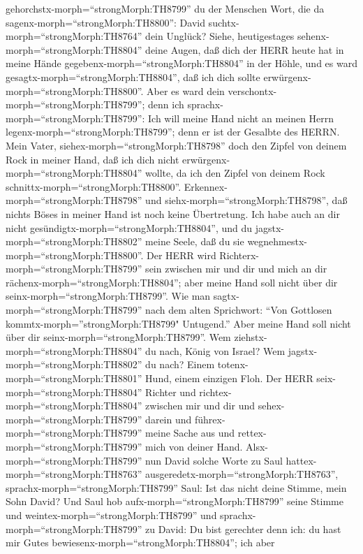 gehorchstx-morph=``strongMorph:TH8799'' du der Menschen Wort, die da
sagenx-morph=``strongMorph:TH8800'': David
suchtx-morph=``strongMorph:TH8764'' dein Unglück?  Siehe,
heutigestages sehenx-morph=``strongMorph:TH8804'' deine Augen, daß dich
der HERR heute hat in meine Hände gegebenx-morph=``strongMorph:TH8804''
in der Höhle, und es ward gesagtx-morph=``strongMorph:TH8804'', daß ich
dich sollte erwürgenx-morph=``strongMorph:TH8800''. Aber es ward dein
verschontx-morph=``strongMorph:TH8799''; denn ich
sprachx-morph=``strongMorph:TH8799'': Ich will meine Hand nicht an
meinen Herrn legenx-morph=``strongMorph:TH8799''; denn er ist der
Gesalbte des HERRN.  Mein Vater,
siehex-morph=``strongMorph:TH8798'' doch den Zipfel von deinem Rock in
meiner Hand, daß ich dich nicht erwürgenx-morph=``strongMorph:TH8804''
wollte, da ich den Zipfel von deinem Rock
schnittx-morph=``strongMorph:TH8800''.
Erkennex-morph=``strongMorph:TH8798'' und
siehx-morph=``strongMorph:TH8798'', daß nichts Böses in meiner Hand ist
noch keine Übertretung. Ich habe auch an dir nicht
gesündigtx-morph=``strongMorph:TH8804'', und du
jagstx-morph=``strongMorph:TH8802'' meine Seele, daß du sie
wegnehmestx-morph=``strongMorph:TH8800''.  Der HERR wird
Richterx-morph=``strongMorph:TH8799'' sein zwischen mir und dir und mich
an dir rächenx-morph=``strongMorph:TH8804''; aber meine Hand soll nicht
über dir seinx-morph=``strongMorph:TH8799''.  Wie man
sagtx-morph=``strongMorph:TH8799'' nach dem alten Sprichwort: ``Von
Gottlosen kommtx-morph=''strongMorph:TH8799" Untugend.'' Aber meine Hand
soll nicht über dir seinx-morph=``strongMorph:TH8799''. 
Wem ziehstx-morph=``strongMorph:TH8804'' du nach, König von Israel? Wem
jagstx-morph=``strongMorph:TH8802'' du nach? Einem
totenx-morph=``strongMorph:TH8801'' Hund, einem einzigen Floh.
 Der HERR seix-morph=``strongMorph:TH8804'' Richter und
richtex-morph=``strongMorph:TH8804'' zwischen mir und dir und
sehex-morph=``strongMorph:TH8799'' darein und
führex-morph=``strongMorph:TH8799'' meine Sache aus und
rettex-morph=``strongMorph:TH8799'' mich von deiner Hand. 
Alsx-morph=``strongMorph:TH8799'' nun David solche Worte zu Saul
hattex-morph=``strongMorph:TH8763''
ausgeredetx-morph=``strongMorph:TH8763'',
sprachx-morph=``strongMorph:TH8799'' Saul: Ist das nicht deine Stimme,
mein Sohn David? Und Saul hob aufx-morph=``strongMorph:TH8799'' seine
Stimme und weintex-morph=``strongMorph:TH8799''  und
sprachx-morph=``strongMorph:TH8799'' zu David: Du bist gerechter denn
ich: du hast mir Gutes bewiesenx-morph=``strongMorph:TH8804''; ich aber
